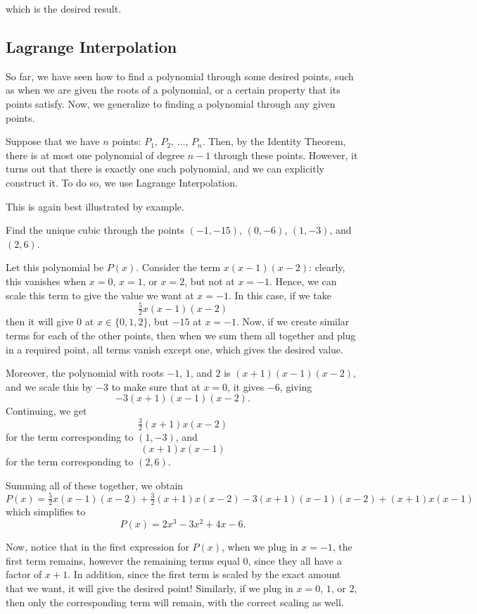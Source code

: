 \documentclass[11pt]{scrartcl}
\begin{document}
which is the desired result.

\subsection{Lagrange Interpolation}

So far, we have seen how to find a polynomial through some desired points, such as when we are given the roots of a polynomial, or a certain property that its points satisfy. Now, we generalize to finding a polynomial through any given points.

Suppose that we have $n$ points: $P_1$, $P_2$, $\dots$, $P_n$. Then, by the Identity Theorem, there is at most one polynomial of degree $n-1$ through these points. However, it turns out that there is exactly one such polynomial, and we can explicitly construct it. To do so, we use Lagrange Interpolation.

This is again best illustrated by example.

\begin{example*}
Find the unique cubic through the points $(-1, -15)$, $(0, -6)$, $(1, -3)$, and $(2, 6)$.
\end{example*}

Let this polynomial be $P(x)$. Consider the term $x(x-1)(x-2)$: clearly, this vanishes when $x = 0$, $x = 1$, or $x = 2$, but not at $x = -1$. Hence, we can scale this term to give the value we want at $x = -1$. In this case, if we take \[\tfrac{5}{2}x(x-1)(x-2)\] then it will give $0$ at $x \in \{0, 1, 2\}$, but $-15$ at $x = -1$. Now, if we create similar terms for each of the other points, then when we sum them all together and plug in a required point, all terms vanish except one, which gives the desired value.

Moreover, the polynomial with roots $-1$, $1$, and $2$ is $(x+1)(x-1)(x-2)$, and we scale this by $-3$ to make sure that at $x = 0$, it gives $-6$, giving
\[-3(x+1)(x-1)(x-2).\] Continuing, we get \[\tfrac{3}{2}(x+1)x(x-2)\] for the term corresponding to $(1, -3)$, and \[(x+1)x(x-1)\] for the term corresponding to $(2, 6)$.

Summing all of these together, we obtain \[P(x) = \tfrac{5}{2}x(x-1)(x-2)+ \tfrac{3}{2}(x+1)x(x-2)- 3(x+1)(x-1)(x-2)+ (x+1)x(x-1)\] which simplifies to \[P(x) = 2x^3 - 3x^2 + 4x - 6.\]

Now, notice that in the first expression for $P(x)$, when we plug in $x = -1$, the first term remains, however the remaining terms equal $0$, since they all have a factor of $x+1$. In addition, since the first term is scaled by the exact amount that we want, it will give the desired point! Similarly, if we plug in $x = 0$, $1$, or $2$, then only the corresponding term will remain, with the correct scaling as well.
\end{document}
